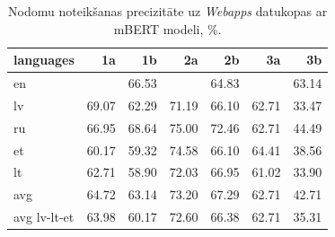 \begin{table}[htbp]
  \centering
  \caption{Nodomu noteikšanas precizitāte uz \textit{Webapps} datukopas ar mBERT modeli, \%.}
    \begin{tabular}{lrrrrrr}\toprule
    languages & 1a & 1b & 2a & 2b & 3a & 3b \\\midrule
    en    &       & \cellcolor[rgb]{ .843,  .886,  .949}66.53 &       & \cellcolor[rgb]{ .941,  .957,  .984}64.83 &       & \cellcolor[rgb]{ .984,  .969,  .98}63.14 \\
    lv    & \cellcolor[rgb]{ .698,  .784,  .898}69.07 & \cellcolor[rgb]{ .984,  .953,  .965}62.29 & \cellcolor[rgb]{ .576,  .698,  .855}71.19 & \cellcolor[rgb]{ .867,  .906,  .961}66.10 & \cellcolor[rgb]{ .984,  .961,  .973}62.71 & \cellcolor[rgb]{ .973,  .412,  .42}33.47 \\
    ru    & \cellcolor[rgb]{ .82,  .871,  .941}66.95 & \cellcolor[rgb]{ .722,  .8,  .906}68.64 & \cellcolor[rgb]{ .353,  .541,  .776}75.00 & \cellcolor[rgb]{ .502,  .647,  .831}72.46 & \cellcolor[rgb]{ .984,  .961,  .973}62.71 & \cellcolor[rgb]{ .976,  .62,  .627}44.49 \\
    et    & \cellcolor[rgb]{ .984,  .914,  .925}60.17 & \cellcolor[rgb]{ .984,  .898,  .91}59.32 & \cellcolor[rgb]{ .38,  .561,  .788}74.58 & \cellcolor[rgb]{ .867,  .906,  .961}66.10 & \cellcolor[rgb]{ .965,  .973,  .992}64.41 & \cellcolor[rgb]{ .973,  .506,  .514}38.56 \\
    lt    & \cellcolor[rgb]{ .984,  .961,  .973}62.71 & \cellcolor[rgb]{ .984,  .89,  .902}58.90 & \cellcolor[rgb]{ .525,  .663,  .839}72.03 & \cellcolor[rgb]{ .82,  .871,  .941}66.95 & \cellcolor[rgb]{ .984,  .929,  .941}61.02 & \cellcolor[rgb]{ .973,  .42,  .427}33.90 \\\midrule
    avg   & \cellcolor[rgb]{ .949,  .961,  .988}64.72 & \cellcolor[rgb]{ .984,  .969,  .98}63.14 & \cellcolor[rgb]{ .459,  .616,  .816}73.20 & \cellcolor[rgb]{ .8,  .855,  .933}67.29 & \cellcolor[rgb]{ .984,  .961,  .973}62.71 & \cellcolor[rgb]{ .976,  .584,  .592}42.71 \\
    avg lv-lt-et & \cellcolor[rgb]{ .988,  .988,  1}63.98 & \cellcolor[rgb]{ .984,  .914,  .925}60.17 & \cellcolor[rgb]{ .494,  .639,  .827}72.60 & \cellcolor[rgb]{ .851,  .894,  .953}66.38 & \cellcolor[rgb]{ .984,  .961,  .973}62.71 & \cellcolor[rgb]{ .973,  .443,  .451}35.31 \\\bottomrule
    \end{tabular}%
  \label{tab:webapps-bert}%
\end{table}%


